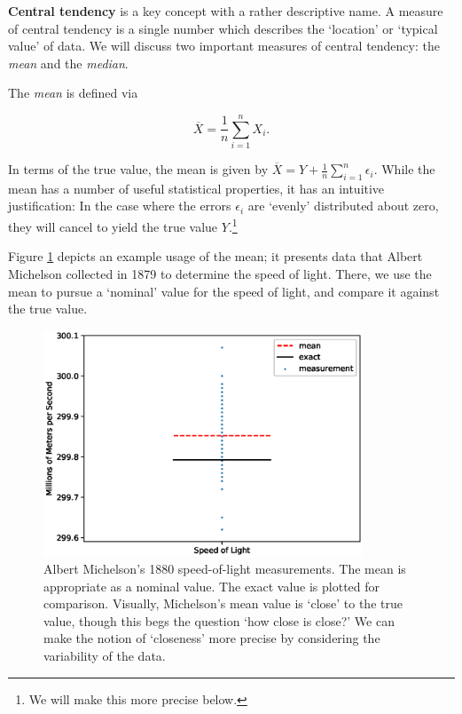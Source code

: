 \documentclass[../primer.tex]{subfiles}
\begin{document}
\textbf{Central tendency} is a key concept with a rather descriptive name. A
measure of central tendency is a single number which describes the `location' or
`typical value' of data. We will discuss two important measures of central
tendency: the \emph{mean} and the \emph{median}.

The \emph{mean} is defined via

\begin{equation} \label{eq:def-sample-mean}
  \overline{X} = \frac{1}{n}\sum_{i=1}^n X_i.
\end{equation}

\noindent In terms of the true value, the mean is given by $\overline{X} = Y +
\frac{1}{n}\sum_{i=1}^n \epsilon_i$. While the mean has a number of useful
statistical properties, it has an intuitive justification: In the case where the
errors $\epsilon_i$ are `evenly' distributed about zero, they will cancel to
yield the true value $Y$.\footnote{We will make this more precise below.}

Figure \ref{fig:michelson-mean} depicts an example usage of the mean; it
presents data that Albert Michelson collected in 1879 to determine the speed of
light.\cite{dorsey1944velocity} There, we use the mean to pursue a `nominal'
value for the speed of light, and compare it against the true value.

\begin{figure}[!ht]
  \centering
  \includegraphics[width=0.85\textwidth]{./images/michelson_scatter}

  \caption{Albert Michelson's 1880 speed-of-light measurements. The mean is
    appropriate as a nominal value. The exact value is plotted for comparison.
    Visually, Michelson's mean value is `close' to the true value, though this
    begs the question `how close is close?' We can make the notion of
    `closeness' more precise by considering the variability of the data.}
  \label{fig:michelson-mean}
\end{figure}
\end{document}
